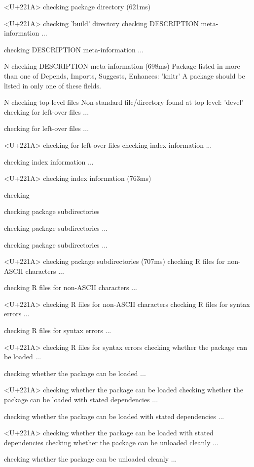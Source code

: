 \documentclass[a4paper,12pt]{article}\usepackage[]{graphicx}\usepackage[]{color}
\begin{document}
\begin{Schunk}
\begin{Soutput}
  
<U+221A>  checking package directory (621ms)

  
<U+221A>  checking 'build' directory
   checking DESCRIPTION meta-information ...
  
   checking DESCRIPTION meta-information ... 
  
N  checking DESCRIPTION meta-information (698ms)
   Package listed in more than one of Depends, Imports, Suggests, Enhances:
     'knitr'
   A package should be listed in only one of these fields.

  
N  checking top-level files
   Non-standard file/directory found at top level:
     'devel'
   checking for left-over files ...
  
   checking for left-over files ... 
  
<U+221A>  checking for left-over files
   checking index information ...
  
   checking index information ... 
  
<U+221A>  checking index information (763ms)

  
  
  
   checking 
  
   checking package subdirectories
  
   checking package subdirectories ...
  
   checking package subdirectories ... 
  
<U+221A>  checking package subdirectories (707ms)
   checking R files for non-ASCII characters ...
  
   checking R files for non-ASCII characters ... 
  
<U+221A>  checking R files for non-ASCII characters
   checking R files for syntax errors ...
  
   checking R files for syntax errors ... 
  
<U+221A>  checking R files for syntax errors
   checking whether the package can be loaded ...
  
   checking whether the package can be loaded ... 
  
<U+221A>  checking whether the package can be loaded
   checking whether the package can be loaded with stated dependencies ...
  
   checking whether the package can be loaded with stated dependencies ... 
  
<U+221A>  checking whether the package can be loaded with stated dependencies
   checking whether the package can be unloaded cleanly ...
  
   checking whether the package can be unloaded cleanly ... 
  

\end{Soutput}
\end{Schunk}
\end{document}
